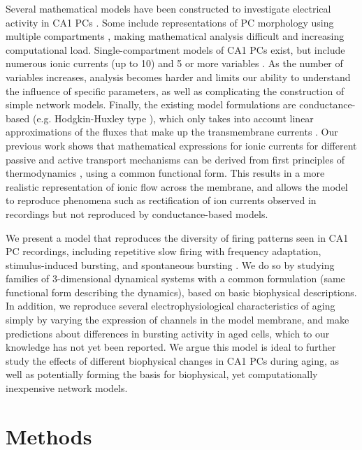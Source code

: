 \documentclass[12pt]{article}
\begin{document}
Several mathematical models have been constructed to  investigate electrical activity in CA1 PCs \cite{bianchi2012mechanisms,golomb2006contribution,gu2005kv7,poirazi2003arithmetic,shah2008functional,shao1999role}. Some include representations of PC morphology using multiple compartments \cite{gu2005kv7,poirazi2003arithmetic,shah2008functional,shao1999role}, making mathematical analysis difficult and increasing computational load. Single-compartment models of CA1 PCs exist, but include numerous ionic currents (up to 10) and 5 or more variables \cite{bianchi2012mechanisms,golomb2006contribution}. As the number of variables increases, analysis becomes harder and limits our ability to understand the influence of specific parameters, as well as complicating the construction of simple network models. Finally, the existing model formulations are conductance-based (e.g. Hodgkin-Huxley type \cite{hodgkin1952quantitative}), which only takes into account linear approximations of the fluxes that make up the transmembrane currents \citep{herrera2018thermodynamic}. Our previous work shows that mathematical expressions for ionic currents for different passive and active transport mechanisms can be derived from first principles of thermodynamics \cite{herrera2012membranes,herrera2013relating,herrera2018thermodynamic}, using a common functional form. This results in a more realistic representation of ionic flow across the membrane, and allows the model to reproduce phenomena such as rectification of ion currents observed in recordings but not reproduced by conductance-based models.

We present a  model that reproduces the diversity of firing patterns seen in CA1 PC recordings, including repetitive slow firing with frequency adaptation, stimulus-induced bursting, and spontaneous bursting \cite{mckiernan2017ca1}. We do so by studying families of 3-dimensional dynamical systems with a common formulation (same functional form describing the dynamics), based on basic biophysical descriptions.  In addition, we reproduce several electrophysiological characteristics of aging simply by varying the expression of {\Ca} channels in the model membrane, and make predictions about differences in bursting activity in aged cells, which to our knowledge has not yet been reported. We argue this model is ideal to further study the effects of different biophysical changes in CA1 PCs during aging, as well as potentially forming the basis for biophysical, yet computationally inexpensive network models.

\section{Methods}
\end{document}

